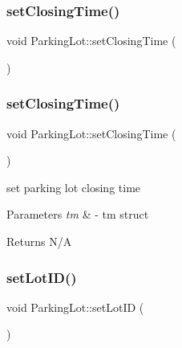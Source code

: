 \subsubsection{\texorpdfstring{set\+Closing\+Time()}{setClosingTime()}\hspace{0.1cm}{\footnotesize\ttfamily [1/2]}}
{\footnotesize\ttfamily void Parking\+Lot\+::set\+Closing\+Time (\begin{DoxyParamCaption}\item[{tm}]{ }\end{DoxyParamCaption})}

\mbox{\label{class_parking_lot_a1406d44ee8d0dcb0c192176d706b437c}} 
\subsubsection{\texorpdfstring{set\+Closing\+Time()}{setClosingTime()}\hspace{0.1cm}{\footnotesize\ttfamily [2/2]}}
{\footnotesize\ttfamily void Parking\+Lot\+::set\+Closing\+Time (\begin{DoxyParamCaption}\item[{tm}]{ }\end{DoxyParamCaption})}



set parking lot closing time 


\begin{DoxyParams}{Parameters}
{\em tm} & -\/ tm struct \\
\hline
\end{DoxyParams}
\begin{DoxyReturn}{Returns}
N/A 
\end{DoxyReturn}
\mbox{\label{class_parking_lot_a10ff48e3483395f5fa7fd15a80913515}} 
\subsubsection{\texorpdfstring{set\+Lot\+I\+D()}{setLotID()}\hspace{0.1cm}{\footnotesize\ttfamily [1/2]}}
{\footnotesize\ttfamily void Parking\+Lot\+::set\+Lot\+ID (\begin{DoxyParamCaption}\item[{int}]{ }\end{DoxyParamCaption})}

